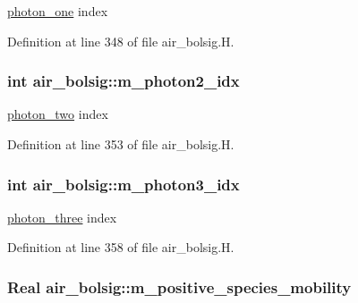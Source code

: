 \hyperlink{classair__bolsig_1_1photon__one}{photon\+\_\+one} index 



Definition at line 348 of file air\+\_\+bolsig.\+H.

\subsubsection[{\texorpdfstring{m\+\_\+photon2\+\_\+idx}{m_photon2_idx}}]{\setlength{\rightskip}{0pt plus 5cm}int air\+\_\+bolsig\+::m\+\_\+photon2\+\_\+idx\hspace{0.3cm}{\ttfamily [protected]}}\hypertarget{classair__bolsig_ab843050b16a5d35962f28b15b50d39a9}{}\label{classair__bolsig_ab843050b16a5d35962f28b15b50d39a9}


\hyperlink{classair__bolsig_1_1photon__two}{photon\+\_\+two} index 



Definition at line 353 of file air\+\_\+bolsig.\+H.

\subsubsection[{\texorpdfstring{m\+\_\+photon3\+\_\+idx}{m_photon3_idx}}]{\setlength{\rightskip}{0pt plus 5cm}int air\+\_\+bolsig\+::m\+\_\+photon3\+\_\+idx\hspace{0.3cm}{\ttfamily [protected]}}\hypertarget{classair__bolsig_a985aa63634a9723b9c77d15f9526109c}{}\label{classair__bolsig_a985aa63634a9723b9c77d15f9526109c}


\hyperlink{classair__bolsig_1_1photon__three}{photon\+\_\+three} index 



Definition at line 358 of file air\+\_\+bolsig.\+H.

\subsubsection[{\texorpdfstring{m\+\_\+positive\+\_\+species\+\_\+mobility}{m_positive_species_mobility}}]{\setlength{\rightskip}{0pt plus 5cm}Real air\+\_\+bolsig\+::m\+\_\+positive\+\_\+species\+\_\+mobility\hspace{0.3cm}{\ttfamily [protected]}}\hypertarget{classair__bolsig_a94cb53186e073ba5a255b2e2a65e6008}{}\label{classair__bolsig_a94cb53186e073ba5a255b2e2a65e6008}


